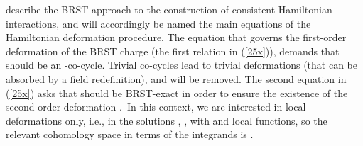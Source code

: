 \documentclass[a4paper,12pt]{article}
\begin{document}
describe the BRST approach to the construction of consistent Hamiltonian
interactions, and will accordingly be named the main equations of the
Hamiltonian deformation procedure. The equation that governs the first-order
deformation of the BRST charge (the first relation in (\ref{25x})), demands
that \coordHE{} should be an \coordHE{}-co-cycle. Trivial co-cycles lead to
trivial deformations (that can be absorbed by a field redefinition), and
will be removed. The second equation in (\ref{25x}) asks that \coordHE{} should be BRST-exact in order to ensure the
existence of the second-order deformation \coordHE{}.\ In this context,
we are interested in local deformations only, i.e., in the solutions \coordHE{}, \coordHE{}, with \coordHE{}
and \coordHE{} local functions, so the relevant cohomology space in terms of
the integrands is \coordHE{}.
\end{document}
